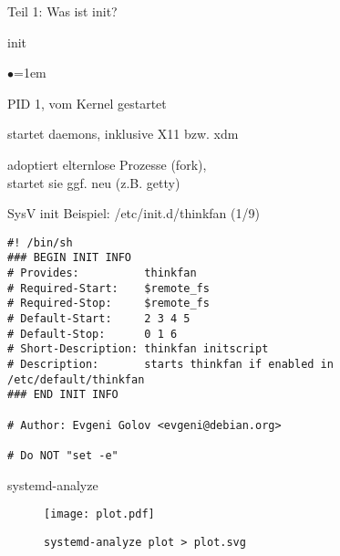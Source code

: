 \documentclass[usepdftitle=false,compress]{beamer}
\begin{document}
\newcommand{\mslide}[2]{
    \begin{frame}{#1}
        \begin{list}{$\bullet$}{\itemsep=1em}
            #2
        \end{list}
    \end{frame}
}


\begin{frame}{}
\begin{center}
{\Huge Teil 1: Was ist init?}
\end{center}
\end{frame}

\mslide{init}{
	\item PID 1, vom Kernel gestartet
	\item startet daemons, inklusive X11 bzw. xdm
	\item adoptiert elternlose Prozesse (fork),\\
    startet sie ggf. neu (z.B. getty)
}

\begin{frame}[fragile]{SysV init Beispiel: /etc/init.d/thinkfan (1/9)}
\begin{verbatim}
#! /bin/sh
### BEGIN INIT INFO
# Provides:          thinkfan
# Required-Start:    $remote_fs
# Required-Stop:     $remote_fs
# Default-Start:     2 3 4 5
# Default-Stop:      0 1 6
# Short-Description: thinkfan initscript
# Description:       starts thinkfan if enabled in /etc/default/thinkfan
### END INIT INFO

# Author: Evgeni Golov <evgeni@debian.org>

# Do NOT "set -e"
\end{verbatim}
\end{frame}

\begin{frame}[fragile]{systemd-analyze}
    \begin{figure}
    \texttt{[image: plot.pdf]}
    \caption{\texttt{systemd-analyze plot > plot.svg}}
    \end{figure}
\end{frame}
\end{document}
